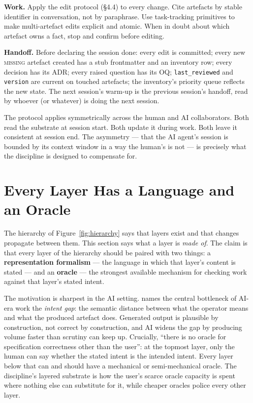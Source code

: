\documentclass[11pt,a4paper,twocolumn]{article}
\begin{document}
\textbf{Work.} Apply the edit protocol (\S4.4) to every change.
Cite artefacts by stable identifier in conversation, not by
paraphrase. Use task-tracking primitives to make multi-artefact
edits explicit and atomic. When in doubt about which artefact owns
a fact, stop and confirm before editing.

\textbf{Handoff.} Before declaring the session done: every edit is
committed; every new \textsc{missing} artefact created has a stub
frontmatter and an inventory row; every decision has its ADR;
every raised question has its OQ; \texttt{last\_reviewed} and
\texttt{version} are current on touched artefacts; the inventory's
priority queue reflects the new state. The next session's warm-up
is the previous session's handoff, read by whoever (or whatever)
is doing the next session.

The protocol applies symmetrically across the human and AI
collaborators. Both read the substrate at session start. Both
update it during work. Both leave it consistent at session end.
The asymmetry --- that the AI agent's session is bounded by its
context window in a way the human's is not --- is precisely what
the discipline is designed to compensate for.

\section{Every Layer Has a Language and an Oracle}
\label{sec:oracles}

The hierarchy of Figure~\ref{fig:hierarchy} says that layers
exist and that changes propagate between them. This section says
what a layer is \emph{made of}. The claim is that every layer of
the hierarchy should be paired with two things: a
\textbf{representation formalism} --- the language in which that
layer's content is stated --- and an \textbf{oracle} --- the
strongest available mechanism for checking work against that
layer's stated intent.

The motivation is sharpest in the AI setting.
\citet{lahiri2026intent} names the central bottleneck of AI-era
work the \emph{intent gap}: the semantic distance between what the
operator means and what the produced artefact does. Generated
output is plausible by construction, not correct by construction,
and AI widens the gap by producing volume faster than scrutiny can
keep up. Crucially, ``there is no oracle for specification
correctness other than the user'': at the topmost layer, only the
human can say whether the stated intent is the intended intent.
Every layer below that can and should have a mechanical or
semi-mechanical oracle. The discipline's layered substrate is how
the user's scarce oracle capacity is spent where nothing else can
substitute for it, while cheaper oracles police every other layer.
\end{document}
